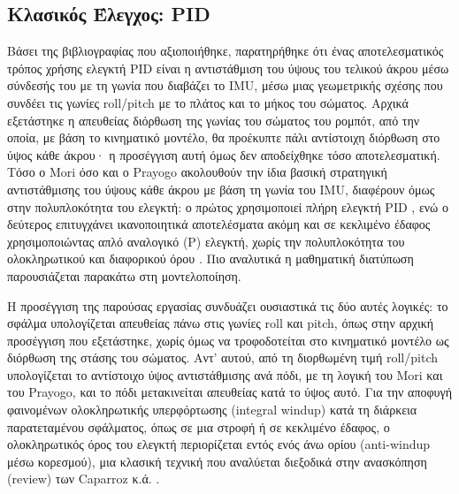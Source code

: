 \documentclass[11pt]{report}
\begin{document}
\subsection{Κλασικός Έλεγχος: PID}
\label{subsec:pid-litreview}
Βάσει της βιβλιογραφίας που αξιοποιήθηκε, παρατηρήθηκε ότι ένας αποτελεσματικός
τρόπος χρήσης ελεγκτή PID είναι η αντιστάθμιση του ύψους του τελικού άκρου
μέσω σύνδεσής του με τη γωνία που διαβάζει το IMU, μέσω μιας γεωμετρικής
σχέσης που συνδέει τις γωνίες roll/pitch με το πλάτος και το μήκος του
σώματος. Αρχικά εξετάστηκε η απευθείας διόρθωση της γωνίας του σώματος του
ρομπότ, από την οποία, με βάση το κινηματικό μοντέλο, θα προέκυπτε πάλι
αντίστοιχη διόρθωση στο ύψος κάθε άκρου· η προσέγγιση αυτή όμως δεν
αποδείχθηκε τόσο αποτελεσματική. Τόσο ο Mori όσο και ο Prayogo ακολουθούν
την ίδια βασική στρατηγική αντιστάθμισης του ύψους κάθε άκρου με βάση τη
γωνία του IMU, διαφέρουν όμως στην πολυπλοκότητα του ελεγκτή: ο πρώτος
χρησιμοποιεί πλήρη ελεγκτή PID \cite{mori_study_2022}, ενώ ο δεύτερος
επιτυγχάνει ικανοποιητικά αποτελέσματα ακόμη και σε κεκλιμένο έδαφος
χρησιμοποιώντας απλό αναλογικό (P) ελεγκτή, χωρίς την πολυπλοκότητα του
ολοκληρωτικού και διαφορικού όρου \cite{prayogo_quadruped_2018}. Πιο
αναλυτικά η μαθηματική διατύπωση παρουσιάζεται παρακάτω στη μοντελοποίηση.

Η προσέγγιση της παρούσας εργασίας συνδυάζει ουσιαστικά τις δύο αυτές
λογικές: το σφάλμα υπολογίζεται απευθείας πάνω στις γωνίες roll και pitch,
όπως στην αρχική προσέγγιση που εξετάστηκε, χωρίς όμως να τροφοδοτείται στο
κινηματικό μοντέλο ως διόρθωση της στάσης του σώματος. Αντ' αυτού, από τη
διορθωμένη τιμή roll/pitch υπολογίζεται το αντίστοιχο ύψος αντιστάθμισης ανά
πόδι, με τη λογική του Mori και του Prayogo, και το πόδι μετακινείται
απευθείας κατά το ύψος αυτό. Για την αποφυγή φαινομένων ολοκληρωτικής
υπερφόρτωσης (integral
windup) κατά τη διάρκεια παρατεταμένου σφάλματος, όπως σε μια στροφή ή σε
κεκλιμένο έδαφος, ο ολοκληρωτικός όρος του ελεγκτή περιορίζεται εντός ενός
άνω ορίου (anti-windup μέσω κορεσμού), μια κλασική τεχνική που αναλύεται
διεξοδικά στην ανασκόπηση (review) των Caparroz κ.ά. \cite{caparroz_antiwindup_2026}.
\end{document}
